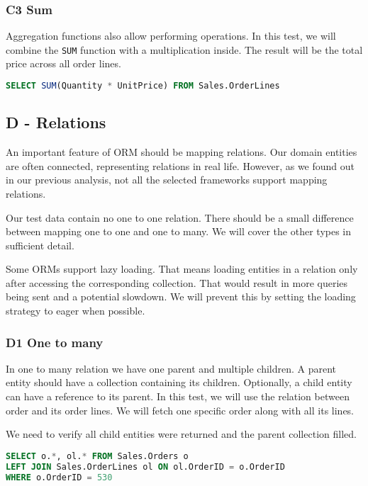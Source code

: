 \subsubsection*{C3 Sum}
Aggregation functions also allow performing operations. In this test, we will combine the \texttt{SUM} function with a multiplication inside. The result will be the total price across all order lines.
\begin{lstlisting}[language=SQL]
SELECT SUM(Quantity * UnitPrice) FROM Sales.OrderLines
\end{lstlisting}

\subsection{D - Relations}
An important feature of ORM should be mapping relations. Our domain entities are often connected, representing relations in real life.
However, as we found out in our previous analysis, not all the selected frameworks support mapping relations. 

Our test data contain no one to one relation. There should be a small difference between mapping one to one and one to many. We will cover the other types in sufficient detail.

Some ORMs support lazy loading. That means loading entities in a relation only after accessing the corresponding collection. That would result in more queries being sent and a potential slowdown.
We will prevent this by setting the loading strategy to eager when possible.

\subsubsection*{D1 One to many}
In one to many relation we have one parent and multiple children. A parent entity should have a collection containing its children. Optionally, a child entity can have a reference to its parent.
In this test, we will use the relation between order and its order lines. We will fetch one specific order along with all its lines.

We need to verify all child entities were returned and the parent collection filled. 



\begin{lstlisting}[language=SQL]
SELECT o.*, ol.* FROM Sales.Orders o
LEFT JOIN Sales.OrderLines ol ON ol.OrderID = o.OrderID
WHERE o.OrderID = 530
\end{lstlisting}

